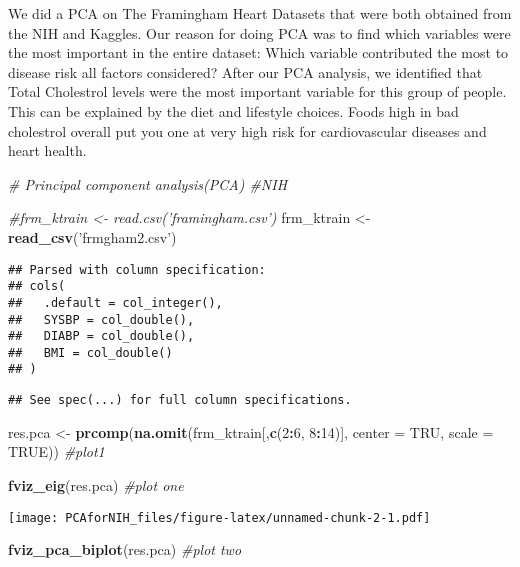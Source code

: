 \documentclass[]{article}
\newenvironment{Shaded}{\begin{snugshade}}{\end{snugshade}}
\newcommand{\KeywordTok}[1]{\textcolor[rgb]{0.13,0.29,0.53}{\textbf{#1}}}
\newcommand{\DataTypeTok}[1]{\textcolor[rgb]{0.13,0.29,0.53}{#1}}
\newcommand{\DecValTok}[1]{\textcolor[rgb]{0.00,0.00,0.81}{#1}}
\newcommand{\StringTok}[1]{\textcolor[rgb]{0.31,0.60,0.02}{#1}}
\newcommand{\CommentTok}[1]{\textcolor[rgb]{0.56,0.35,0.01}{\textit{#1}}}
\newcommand{\OtherTok}[1]{\textcolor[rgb]{0.56,0.35,0.01}{#1}}
\newcommand{\OperatorTok}[1]{\textcolor[rgb]{0.81,0.36,0.00}{\textbf{#1}}}
\newcommand{\NormalTok}[1]{#1}
\begin{document}
We did a PCA on The Framingham Heart Datasets that were both obtained
from the NIH and Kaggles. Our reason for doing PCA was to find which
variables were the most important in the entire dataset: Which variable
contributed the most to disease risk all factors considered? After our
PCA analysis, we identified that Total Cholestrol levels were the most
important variable for this group of people. This can be explained by
the diet and lifestyle choices. Foods high in bad cholestrol overall put
you one at very high risk for cardiovascular diseases and heart health.

\begin{Shaded}
\begin{Highlighting}[]
\CommentTok{# Principal component analysis(PCA) #NIH}

\CommentTok{#frm_ktrain <- read.csv('framingham.csv')}
\NormalTok{frm_ktrain <-}\StringTok{ }\KeywordTok{read_csv}\NormalTok{(}\StringTok{'frmgham2.csv'}\NormalTok{)}
\end{Highlighting}
\end{Shaded}

\begin{verbatim}
## Parsed with column specification:
## cols(
##   .default = col_integer(),
##   SYSBP = col_double(),
##   DIABP = col_double(),
##   BMI = col_double()
## )
\end{verbatim}

\begin{verbatim}
## See spec(...) for full column specifications.
\end{verbatim}

\begin{Shaded}
\begin{Highlighting}[]
\NormalTok{res.pca <-}\StringTok{ }\KeywordTok{prcomp}\NormalTok{(}\KeywordTok{na.omit}\NormalTok{(frm_ktrain[,}\KeywordTok{c}\NormalTok{(}\DecValTok{2}\OperatorTok{:}\DecValTok{6}\NormalTok{, }\DecValTok{8}\OperatorTok{:}\DecValTok{14}\NormalTok{)], }\DataTypeTok{center =}\NormalTok{ TRU, }\DataTypeTok{scale =} \OtherTok{TRUE}\NormalTok{)) }\CommentTok{#plot1}

\KeywordTok{fviz_eig}\NormalTok{(res.pca) }\CommentTok{#plot one}
\end{Highlighting}
\end{Shaded}

\texttt{[image: PCAforNIH\_files/figure-latex/unnamed-chunk-2-1.pdf]}

\begin{Shaded}
\begin{Highlighting}[]
\KeywordTok{fviz_pca_biplot}\NormalTok{(res.pca) }\CommentTok{#plot two}
\end{Highlighting}
\end{Shaded}
\end{document}
